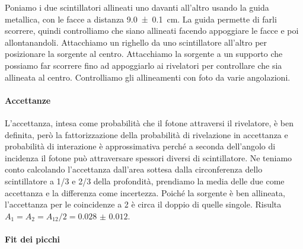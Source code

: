Poniamo i due scintillatori allineati uno davanti all'altro usando la guida metallica,
con le facce a distanza \SI{9.0 \pm 0.1}{cm}.
La guida permette di farli scorrere, quindi controlliamo che siano allineati
facendo appoggiare le facce e poi allontanandoli.
Attacchiamo un righello da uno scintillatore all'altro per posizionare la sorgente al centro.
Attacchiamo la sorgente a un supporto che possiamo far scorrere fino ad appoggiarlo ai rivelatori
per controllare che sia allineata al centro.
Controlliamo gli allineamenti con foto da varie angolazioni.

\paragraph{Accettanze}

L'accettanza, intesa come probabilità che il fotone attraversi il rivelatore, è ben definita,
però la fattorizzazione della probabilità di rivelazione in accettanza e probabilità di interazione
è approssimativa perché a seconda dell'angolo di incidenza il fotone può attraversare spessori diversi di scintillatore.
Ne teniamo conto calcolando l'accettanza dall'area sottesa dalla circonferenza dello scintillatore
a 1/3 e 2/3 della profondità, prendiamo la media delle due come accettanza e la differenza come incertezza.
Poiché la sorgente è ben allineata, l'accettanza per le coincidenze a 2 è circa il doppio di quelle singole.
Risulta $A_1 = A_2 = A_{12}/2 = \num{0.028(12)}$.

\paragraph{Fit dei picchi}

